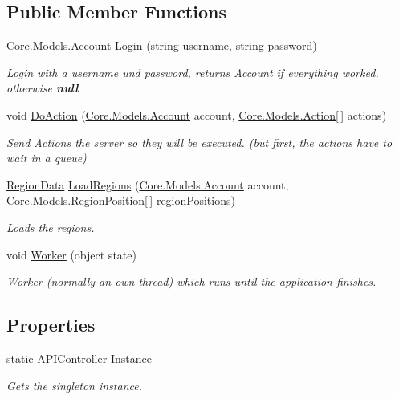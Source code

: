 \subsection*{Public Member Functions}
\begin{DoxyCompactItemize}
\item 
\hyperlink{classCore_1_1Models_1_1Account}{Core.\+Models.\+Account} \hyperlink{classServer_1_1Controllers_1_1APIController_a00ed79b2c42e5c4f39319c38fc492b32}{Login} (string username, string password)
\begin{DoxyCompactList}\small\item\em Login with a username und password, returns Account if everything worked, otherwise {\bfseries null} \end{DoxyCompactList}\item 
void \hyperlink{classServer_1_1Controllers_1_1APIController_abca86085e8c85b2f94b0a95e47a89add}{Do\+Action} (\hyperlink{classCore_1_1Models_1_1Account}{Core.\+Models.\+Account} account, \hyperlink{classCore_1_1Models_1_1Action}{Core.\+Models.\+Action}\mbox{[}$\,$\mbox{]} actions)
\begin{DoxyCompactList}\small\item\em Send Actions the server so they will be executed. (but first, the actions have to wait in a queue) \end{DoxyCompactList}\item 
\hyperlink{classServer_1_1Controllers_1_1APIController_1_1RegionData}{Region\+Data} \hyperlink{classServer_1_1Controllers_1_1APIController_a109e88f8d8e2006aa6408ae775779864}{Load\+Regions} (\hyperlink{classCore_1_1Models_1_1Account}{Core.\+Models.\+Account} account, \hyperlink{classCore_1_1Models_1_1RegionPosition}{Core.\+Models.\+Region\+Position}\mbox{[}$\,$\mbox{]} region\+Positions)
\begin{DoxyCompactList}\small\item\em Loads the regions. \end{DoxyCompactList}\item 
void \hyperlink{classServer_1_1Controllers_1_1APIController_ab0452ab5e12d38f778cc5db9b41bb3a0}{Worker} (object state)
\begin{DoxyCompactList}\small\item\em Worker (normally an own thread) which runs until the application finishes. \end{DoxyCompactList}\end{DoxyCompactItemize}
\subsection*{Properties}
\begin{DoxyCompactItemize}
\item 
static \hyperlink{classServer_1_1Controllers_1_1APIController}{A\+P\+I\+Controller} \hyperlink{classServer_1_1Controllers_1_1APIController_aba201431eb3c55a67e96f3afb2751fc9}{Instance}
\begin{DoxyCompactList}\small\item\em Gets the singleton instance. \end{DoxyCompactList}\end{DoxyCompactItemize}


